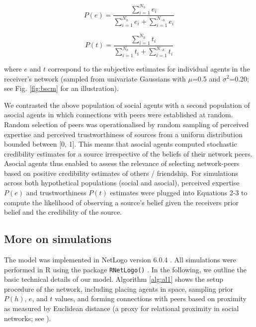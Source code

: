 \documentclass[fleqn,10pt]{wlscirep}
\begin{document}
\begin{equation}
    P(e) = \frac{\sum_{i=1}^{N_h}e_i}{\sum_{i=1}^{N_h}e_i + \sum_{i=1}^{N_{\neg h}}e_i}              
\end{equation}

\begin{equation}
    P(t) = \frac{\sum_{i=1}^{N_h}t_i}{\sum_{i=1}^{N_h}t_i + \sum_{i=1}^{N_{\neg h}}t_i}
\end{equation}

where \(e\) and \(t\) correspond to the subjective estimates for individual agents in the receiver's network (sampled from univariate Gaussians with \(\mu\)=0.5 and \(\sigma^2\)=0.20; see Fig. \ref{fig:bscm} for an illustration).


We contrasted the above population of social agents with a second population of asocial agents in which connections with peers were established at random. Random selection of peers was operationalised by random sampling of perceived expertise and perceived trustworthiness of sources from a uniform distribution bounded between [0, 1]. This means that asocial agents computed stochastic credibility estimates for a source irrespective of the beliefs of their network peers. Asocial agents thus enabled to assess  the relevance of selecting network-peers based on positive credibility estimates of others / friendship. For simulations across both hypothetical populations (social and asocial), perceived expertise \(P(e)\) and trustworthiness \(P(t)\) estimates were plugged into Equations 2-3 to compute the likelihood of observing a source's belief given the receivers prior belief and the credibility of the source.

\subsection*{More on simulations}
The model was implemented in NetLogo version 6.0.4 \cite{wilensky1999netlogo}. All simulations were performed in R using the package {\tt RNetLogo()} \cite{thiele2014r}. In the following, we outline the basic technical details of our model. Algorithm \ref{alg:al1} shows the setup procedure of the network, including placing agents in space, sampling prior \(P(h)\), \(e\), and \(t\) values, and forming connections with peers based on proximity as measured by Euclidean distance (a proxy for relational proximity in social networks; see \cite{duggins2017}).
\end{document}
